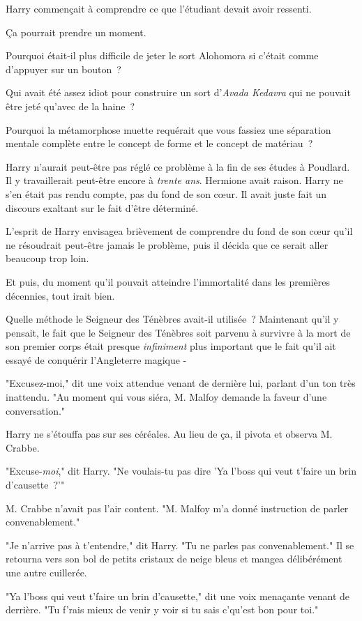 Harry commençait à comprendre ce que l'étudiant devait avoir ressenti.

Ça pourrait prendre un moment.

Pourquoi était-il plus difficile de jeter le sort Alohomora si c'était comme d'appuyer sur un bouton~?

Qui avait été assez idiot pour construire un sort d'\emph{Avada Kedavra} qui ne pouvait être jeté qu'avec de la haine~?

Pourquoi la métamorphose muette requérait que vous fassiez une séparation mentale complète entre le concept de forme et le concept de matériau~?

Harry n'aurait peut-être pas réglé ce problème à la fin de ses études à Poudlard. Il y travaillerait peut-être encore à \emph{trente ans}. Hermione avait raison. Harry ne s'en était pas rendu compte, pas du fond de son cœur. Il avait juste fait un discours exaltant sur le fait d'être déterminé.

L'esprit de Harry envisagea brièvement de comprendre du fond de son cœur qu'il ne résoudrait peut-être jamais le problème, puis il décida que ce serait aller beaucoup trop loin.

Et puis, du moment qu'il pouvait atteindre l'immortalité dans les premières décennies, tout irait bien.

Quelle méthode le Seigneur des Ténèbres avait-il utilisée~? Maintenant qu'il y pensait, le fait que le Seigneur des Ténèbres soit parvenu à survivre à la mort de son premier corps était presque \emph{infiniment} plus important que le fait qu'il ait essayé de conquérir l'Angleterre magique -

"Excusez-moi," dit une voix attendue venant de dernière lui, parlant d'un ton très inattendu. "Au moment qui vous siéra, M. Malfoy demande la faveur d'une conversation."

Harry ne s'étouffa pas sur ses céréales. Au lieu de ça, il pivota et observa M. Crabbe.

"Excuse-\emph{moi}," dit Harry. "Ne voulais-tu pas dire 'Ya l'boss qui veut t'faire un brin d'causette~?'"

M. Crabbe n'avait pas l'air content. "M. Malfoy m'a donné instruction de parler convenablement."

"Je n'arrive pas à t'entendre," dit Harry. "Tu ne parles pas convenablement." Il se retourna vers son bol de petits cristaux de neige bleus et mangea délibérément une autre cuillerée.

"Ya l'boss qui veut t'faire un brin d'causette," dit une voix menaçante venant de derrière. "Tu f'rais mieux de venir y voir si tu sais c'qu'est bon pour toi."


